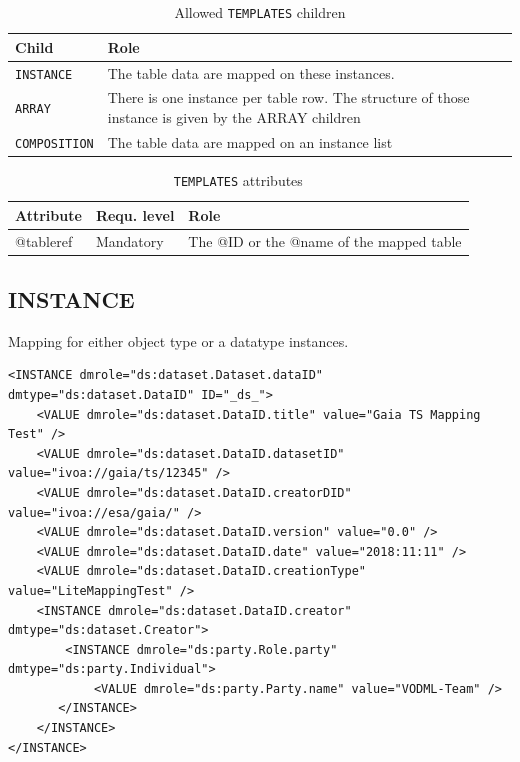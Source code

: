 \documentclass[11pt,a4paper]{ivoa}
\begin{document}
\begin{table}[ht!]
     \begin{tabular}{|p{3cm}|p{7cm}|}
       \hline Child &  Role\\
       \hline  \texttt{INSTANCE}    & The table data are mapped on these instances.  \\              
       \hline  \texttt{ARRAY}    &  There is one instance per table row. The structure of those instance is given by the ARRAY children \\              
       \hline  \texttt{COMPOSITION}    &  The table data are mapped on an instance list\\       
       \hline 
     \end{tabular}
     \caption{Allowed  \texttt{TEMPLATES} children} 
 \end{table}


\begin{table}[ht!]
     \begin{tabular}{|p{1.5cm}|p{4cm}|p{7cm}|}
       \hline Attribute & Requ. level & Role\\
       \hline  @tableref  & Mandatory & The @ID or the @name of the mapped table  \\
       \hline 
     \end{tabular}
     \caption{\texttt{TEMPLATES} attributes} 
 \end{table}


\subsection{INSTANCE}

Mapping for either object type or a datatype instances.


\begin{lstlisting}[caption={INSTANCE bloc example},captionpos=b]
<INSTANCE dmrole="ds:dataset.Dataset.dataID" dmtype="ds:dataset.DataID" ID="_ds_">
    <VALUE dmrole="ds:dataset.DataID.title" value="Gaia TS Mapping Test" />
    <VALUE dmrole="ds:dataset.DataID.datasetID" value="ivoa://gaia/ts/12345" />
    <VALUE dmrole="ds:dataset.DataID.creatorDID" value="ivoa://esa/gaia/" />
    <VALUE dmrole="ds:dataset.DataID.version" value="0.0" />
    <VALUE dmrole="ds:dataset.DataID.date" value="2018:11:11" />
    <VALUE dmrole="ds:dataset.DataID.creationType" value="LiteMappingTest" />
    <INSTANCE dmrole="ds:dataset.DataID.creator" dmtype="ds:dataset.Creator">
        <INSTANCE dmrole="ds:party.Role.party" dmtype="ds:party.Individual">
            <VALUE dmrole="ds:party.Party.name" value="VODML-Team" />
       </INSTANCE>
    </INSTANCE>
</INSTANCE>
\end{lstlisting}
\end{document}
